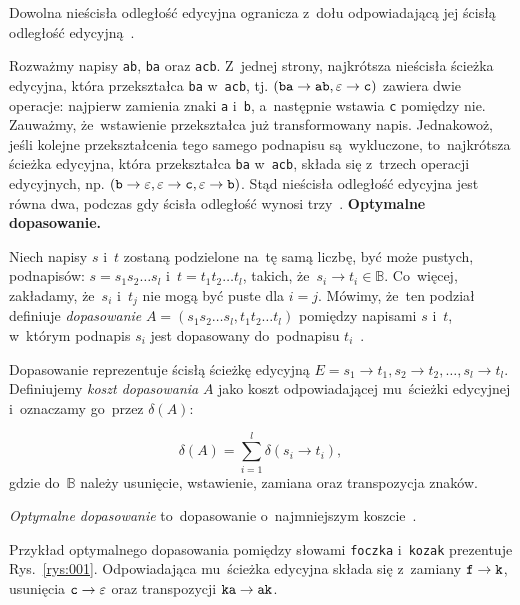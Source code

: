 \documentclass{praca1}
\begin{document}
\begin{lemma}
Dowolna nieścisła odległość edycyjna ogranicza z~dołu odpowiadającą jej ścisłą odległość edycyjną~\cite{Boytsov2011:indexingmethods}.
\end{lemma}

Rozważmy napisy \verb|ab|, \verb|ba| oraz \verb|acb|. Z~jednej strony, najkrótsza nieścisła ścieżka edycyjna, która przekształca \verb|ba| w~\verb|acb|, tj. $(\verb|ba| \rightarrow \verb|ab|, \varepsilon \rightarrow \verb|c|)$ zawiera dwie operacje: najpierw zamienia znaki \verb|a| i~\verb|b|, a~następnie wstawia \verb|c| pomiędzy nie. Zauważmy, że~wstawienie przekształca już transformowany napis. Jednakowoż, jeśli kolejne przekształcenia tego samego podnapisu są~wykluczone, to~najkrótsza ścieżka edycyjna, która przekształca \verb|ba| w~\verb|acb|, składa się z~trzech operacji edycyjnych, np. $(\verb|b| \rightarrow \varepsilon, \varepsilon \rightarrow \verb|c|, \varepsilon \rightarrow \verb|b|)$. Stąd nieścisła odległość edycyjna jest równa dwa, podczas gdy ścisła odległość wynosi trzy~\cite{Boytsov2011:indexingmethods}. 
\textbf{Optymalne dopasowanie.} 
\begin{definition}
Niech napisy $s$ i~$t$ zostaną podzielone na~tę samą liczbę, być może pustych, podnapisów: $s = s_1 s_2 \ldots s_l$ i~$t = t_1 t_2 \ldots t_l$, takich, że~$s_i \rightarrow t_i \in \mathbb{B}$. Co~więcej, zakładamy, że~$s_i$ i~$t_j$ nie mogą być puste dla $i = j$. Mówimy, że~ten podział definiuje \emph{dopasowanie} $A = (s_1 s_2\ldots s_l, t_1 t_2 \ldots t_l)$ pomiędzy napisami $s$ i~$t$, w~którym podnapis $s_i$ jest dopasowany do~podnapisu $t_i$~\cite{Boytsov2011:indexingmethods}.
\end{definition}

Dopasowanie reprezentuje ścisłą ścieżkę edycyjną $E = s_1 \rightarrow t_1, s_2 \rightarrow t_2, \ldots, s_l \rightarrow t_l$. Definiujemy \emph{koszt dopasowania} $A$ jako koszt odpowiadającej mu~ścieżki edycyjnej i~oznaczamy go~przez $\delta(A)$:

\begin{equation}
\label{eq:003}
\delta(A) = \sum\limits_{i = 1}^{l} \delta(s_i \rightarrow t_i),
\end{equation}
gdzie do~$\mathbb{B}$ należy usunięcie, wstawienie, zamiana oraz transpozycja znaków.

\emph{Optymalne dopasowanie} to~dopasowanie o~najmniejszym koszcie~\cite{Boytsov2011:indexingmethods}.


\begin{example}
Przykład optymalnego dopasowania pomiędzy słowami \verb|foczka| i~\verb|kozak| prezentuje Rys.~\ref{rys:001}. Odpowiadająca mu~ścieżka edycyjna składa się z~zamiany $\verb|f| \rightarrow \verb|k|$, usunięcia $\verb|c| \rightarrow \varepsilon$ oraz transpozycji $\verb|ka| \rightarrow \verb|ak|$.
\end{example}
\end{document}
